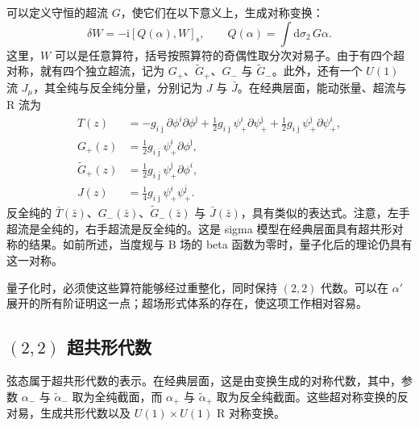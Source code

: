 可以定义守恒的超流 $G$，使它们在以下意义上，生成对称变换：
\begin{equation}\label{eq:3.88}
\delta W=-\mathrm{i}[Q(\alpha),W]_{\mathrm{s}},
\qquad Q(\alpha)=\int\mathrm{d}\sigma_2\,G\alpha.
\end{equation}
这里，$W$ 可以是任意算符，括号按照算符的奇偶性取分次对易子。由于有四个超对称，就有四个独立超流，记为 $G_+$、$\widetilde G_+$、$G_-$ 与 $\widetilde G_-$。此外，还有一个 $U(1)$ 流 $J_\mu$，其全纯与反全纯分量，分别记为 $J$ 与 $\bar J$。在经典层面，能动张量、超流与 R 流为
\begin{equation}\label{eq:3.89}
\begin{aligned}
T(z)&=-g_{i\bar\jmath}\partial\phi^i\partial\phi^{\bar\jmath}
+\tfrac12g_{i\bar\jmath}\psi_+^i\partial\psi_+^{\bar\jmath}
+\tfrac12g_{i\bar\jmath}\psi_+^{\bar\jmath}\partial\psi_+^i,\\
G_+(z)&=\tfrac12g_{i\bar\jmath}\psi_+^i\partial\phi^{\bar\jmath},\\
\widetilde G_+(z)&=\tfrac12g_{i\bar\jmath}\psi_+^{\bar\jmath}\partial\phi^i,\\
J(z)&=\tfrac14g_{i\bar\jmath}\psi_+^i\psi_+^{\bar\jmath}.
\end{aligned}
\end{equation}
反全纯的 $\bar T(\bar z)$、$G_-(\bar z)$、$\widetilde G_-(\bar z)$ 与 $\bar J(\bar z)$，具有类似的表达式。注意，左手超流是全纯的，右手超流是反全纯的。这是 sigma 模型在经典层面具有超共形对称的结果。如前所述，当度规与 B 场的 beta 函数为零时，量子化后的理论仍具有这一对称。

量子化时，必须使这些算符能够经过重整化，同时保持 $(2,2)$ 代数。可以在 $\alpha'$ 展开的所有阶证明这一点；超场形式体系的存在，使这项工作相对容易。

\subsection{\texorpdfstring{$(2,2)$}{(2,2)} 超共形代数}\label{sec:3.3.3}

弦态属于超共形代数的表示。在经典层面，这是由变换生成的对称代数，其中，参数 $\alpha_-$ 与 $\widetilde\alpha_-$ 取为全纯截面，而 $\alpha_+$ 与 $\widetilde\alpha_+$ 取为反全纯截面。这些超对称变换的反对易，生成共形代数以及 $U(1)\times U(1)$ R 对称变换。

